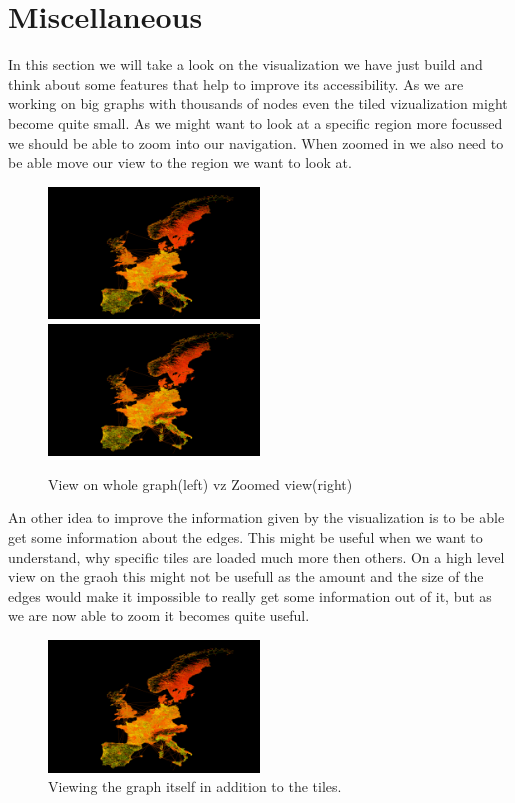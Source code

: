 \documentclass
[
	paper = a4,
    pagesize,
	12 pt,
	oneside,                       %
    open = right,
	DIV = calc,
	BCOR = 0 mm,                   %
	bibtotoc
]
{scrbook}
\begin{document}
\section{Miscellaneous}

In this section we will take a look on the visualization we have just build and think about some features that help to improve its accessibility.
As we are working on big graphs with thousands of nodes even the tiled vizualization might become quite small.
As we might want to look at a specific region more focussed we should be able to zoom into our navigation.
When zoomed in we also need to be able move our view to the region we want to look at.

\begin{figure}[H]
	\includegraphics[width=0.5\textwidth]{Images/placeholder.png}
	\includegraphics[width=0.5\textwidth]{Images/placeholder.png}
\caption[]{View on whole graph(left) vz Zoomed view(right)}
\label{fig:splitted tiles}
\end{figure}


An other idea to improve the information given by the visualization is to be able get some information about the edges.
This might be useful when we want to understand, why specific tiles are loaded much more then others.
On a high level view on the graoh this might not be usefull as the amount and the size of the edges would make it impossible to really get some information out of it, but as we are now able to zoom it becomes quite useful.

\begin{figure}[H]
	\includegraphics[width=0.5\textwidth]{Images/placeholder.png}
\caption[]{Viewing the graph itself in addition to the tiles.}
\label{fig:splitted tiles}
\end{figure}
\end{document}
